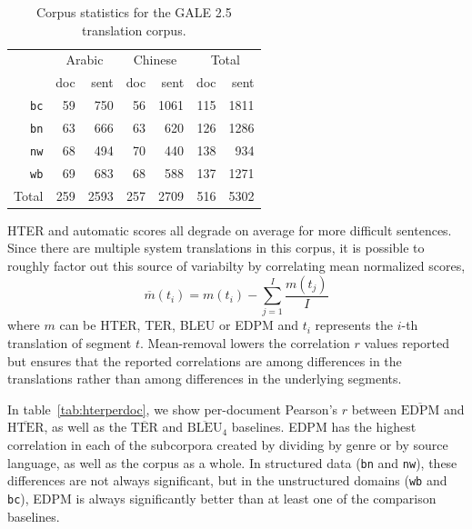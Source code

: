 \documentclass{kluwer}    %
\begin{document}
\begin{article}
\begin{table}
  \begin{tabular}{r|rr|rr|rr}
    \hline
     & \multicolumn{2}{c|}{Arabic} & \multicolumn{2}{c|}{Chinese}
     & \multicolumn{2}{c}{Total}\\
     & doc & sent & doc & sent & doc   & sent\\
     \hline
     \texttt{bc}    & 59  & 750 & 56 & 1061 & 115 & 1811\\
     \texttt{bn}    & 63  & 666 & 63 & 620  & 126 & 1286\\
     \texttt{nw}    & 68  & 494 & 70 & 440  & 138 & 934 \\
     \texttt{wb}    & 69  & 683 & 68 & 588  & 137 & 1271\\
     \hline
     Total & 259 & 2593& 257& 2709 & 516 & 5302\\
     \hline
  \end{tabular}
  \caption{Corpus statistics for the GALE 2.5 translation
    corpus.}
  \label{tab:galestats}
\end{table}

HTER and automatic scores all degrade on average for more difficult sentences.
Since there are multiple system translations in this corpus, it is possible to 
roughly factor out this source of variabilty by correlating mean normalized
scores,
\begin{equation}
  \label{eq:meansub}
  \overline{m}(t_i) = m(t_i) - \sum_{j=1}^I\frac{m(t_j)}{I}
\end{equation}
where $m$ can be HTER, TER, BLEU or EDPM and $t_i$
represents the $i$-th translation of segment $t$.
Mean-removal lowers the correlation $r$ values reported but ensures
that the reported correlations are among differences in the
translations rather than among differences in the underlying segments.

In table~\ref{tab:hterperdoc}, we show per-document Pearson's $r$
between $\overline{\textrm{EDPM}}$ and $\overline{\textrm{HTER}}$, as well as the $\overline{\textrm{TER}}$ and $\overline{\textrm{BLEU}}$$_4$
baselines. EDPM has the highest correlation in each of the
subcorpora created by dividing by genre or by source language, as well
as the corpus as a whole.   In structured data
(\texttt{bn} and \texttt{nw}), these differences are not always
significant, but in the unstructured domains (\texttt{wb} and
\texttt{bc}), EDPM is always significantly better than at least one of
the comparison baselines.


\end{article}
\end{document}

